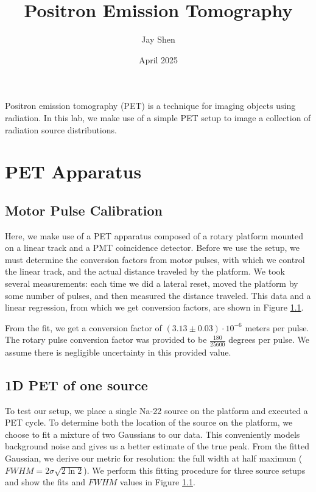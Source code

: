 \documentclass[12pt, letterpaper]{article}
\title{Positron Emission Tomography}
\author{Jay Shen}
\date{April 2025}
\begin{document}
\maketitle

Positron emission tomography (PET) is a technique for imaging objects using radiation. In this lab, we make use of a simple PET setup to image a collection of radiation source distributions. 

\section{PET Apparatus}

\subsection{Motor Pulse Calibration}

Here, we make use of a PET apparatus composed of a rotary platform mounted on a linear track and a PMT coincidence detector. Before we use the setup, we must determine the conversion factors from motor pulses, with which we control the linear track, and the actual distance traveled by the platform. We took several measurements: each time we did a lateral reset, moved the platform by some number of pulses, and then measured the distance traveled. This data and a linear regression, from which we get conversion factors, are shown in Figure \ref{}. 

From the fit, we get a conversion factor of $(3.13 \pm 0.03) \cdot 10^{-6}$ meters per pulse. The rotary pulse conversion factor was provided to be $\frac{180}{25600}$ degrees per pulse. We assume there is negligible uncertainty in this provided value. 

\subsection{1D PET of one source}\label{sec:resolution}

To test our setup, we place a single Na-22 source on the platform and executed a PET cycle. To determine both the location of the source on the platform, we choose to fit a mixture of two Gaussians to our data. This conveniently models background noise and gives us a better estimate of the true peak. From the fitted Gaussian, we derive our metric for resolution: the full width at half maximum ($FWHM = 2 \sigma \sqrt{2 \ln 2}$). We perform this fitting procedure for three source setups and show the fits and $FWHM$ values in Figure \ref{}. 
\end{document}
